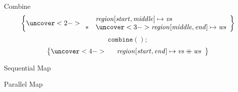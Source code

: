 \begin{frame}{Combine}
  $$\left\lbrace
    \uncover<2->{\begin{array}{cl}
      & \mathit{region}[\mathit{start}, \mathit{middle}] \mapsto \mathit{vs}\\
      \sepconj & \uncover<3->{\mathit{region}[\mathit{middle}, \mathit{end}] \mapsto \mathit{ws}}
    \end{array}}
    \right\rbrace$$
  $$\mathtt{combine}();$$
  $$\left\lbrace
    \uncover<4->{\begin{array}{cl}
      & \mathit{region}[\mathit{start}, \mathit{end}] \mapsto \mathit{vs} \mathop{+\!\!\!+} \mathit{ws}
    \end{array}}
    \right\rbrace$$

\end{frame}


\begin{frame}{Sequential Map}
\end{frame}


\begin{frame}{Parallel Map}
\end{frame}
